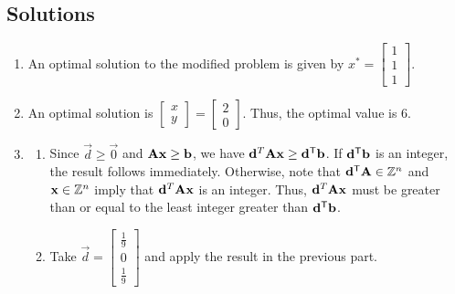 \subsection*{Solutions}\label{solutions-10}

\begin{enumerate}
\def\labelenumi{\arabic{enumi}.}
\item
  An optimal solution to the modified problem is given by
  \(x^* = \begin{bmatrix} 1\\1\\1 \end{bmatrix}\).
\item
  An optimal solution is
  \(\begin{bmatrix} x\\y \end{bmatrix} = \begin{bmatrix} 2 \\ 0\end{bmatrix}\).
  Thus, the optimal value is \(6\).
\item
  \begin{enumerate}
  \def\labelenumii{\alph{enumii}.}
  \item
    Since \(\vec{d} \geq \vec{0}\) and \(\mathbf{A}\mathbf{x} \geq \mathbf{b}\),
    we have \(\mathbf{d}^T\mathbf{A} \mathbf{x} \geq \mathbf{d}^{\mathsf{T}}\mathbf{b}\). If
    \(\mathbf{d}^{\mathsf{T}}\mathbf{b}\) is an integer, the result follows immediately.
    Otherwise, note that \(\mathbf{d}^{\mathsf{T}}\mathbf{A} \in \mathbb{Z}^n\) and
    \(\mathbf{x}\in \mathbb{Z}^n\) imply that \(\mathbf{d}^T\mathbf{A} \mathbf{x}\) is an
    integer. Thus, \(\mathbf{d}^T\mathbf{A} \mathbf{x}\) must be greater than or
    equal to the least integer greater than \(\mathbf{d}^{\mathsf{T}}\mathbf{b}\).
  \item
    Take
    \(\vec{d} = \begin{bmatrix} \frac{1}{9} \\ 0 \\ \frac{1}{9} \end{bmatrix}\)
    and apply the result in the previous part.
  \end{enumerate}
\end{enumerate}

